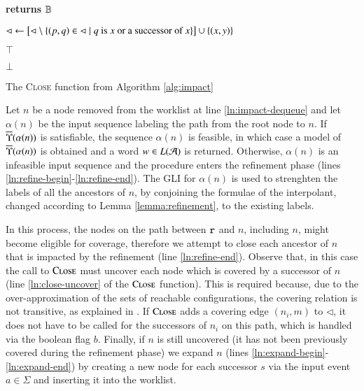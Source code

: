 \begin{algorithm}[htb]
\begin{algorithmic}[1]
 {\bf returns} $\mathbb{B}$



\State $\lhd \leftarrow \left[\lhd \setminus \{  (p,q) \in \lhd \mid
  \text{$q$ is $x$ or a successor of $x$} \}\right] \cup \{ (x,y) \}$
\label{ln:close-uncover}

 $\top$ 

\EndIf

\EndFor

 $\bot$

\EndFunction
\end{algorithmic}
\caption{The \textsc{Close} function from Algorithm \ref{alg:impact}}
\end{algorithm}

Let $n$ be a node removed from the worklist at line
\ref{ln:impact-dequeue} and let $\alpha(n)$ be the input sequence
labeling the path from the root node to $n$. If
$\overline{\Upsilon}({\alpha(n)})$ is satisfiable, the sequence $\alpha(n)$ is
feasible, in which case a model of $\overline{\Upsilon}({\alpha(n)})$ is obtained
and a word $w \in L(\mathcal{A})$ is returned. Otherwise, $\alpha(n)$ is an
infeasible input sequence and the procedure enters the refinement
phase (lines \ref{ln:refine-begin}-\ref{ln:refine-end}). The GLI for
$\alpha(n)$ is used to strenghten the labels of all the ancestors of
$n$, by conjoining the formulae of the interpolant, changed according
to Lemma \ref{lemma:refinement}, to the existing labels.

In this process, the nodes on the path between $\mathtt{r}$ and $n$,
including $n$, might become eligible for coverage, therefore we
attempt to close each ancestor of $n$ that is impacted by the
refinement (line \ref{ln:refine-end}). Observe that, in this case the
call to $\Call{Close}{}$ must uncover each node which is covered by a
successor of $n$ (line \ref{ln:close-uncover} of the $\Call{Close}{}$
function). This is required because, due to the over-approximation of
the sets of reachable configurations, the covering relation is not
transitive, as explained in \cite{McMillan06}. If $\Call{Close}{}$
adds a covering edge $(n_i,m)$ to $\lhd$, it does not have to be
called for the successors of $n_i$ on this path, which is handled via
the boolean flag $b$. Finally, if $n$ is still uncovered (it has not
been previously covered during the refinement phase) we expand $n$
(lines \ref{ln:expand-begin}-\ref{ln:expand-end}) by creating a new
node for each successor $s$ via the input event $a \in \Sigma$ and
inserting it into the worklist.


